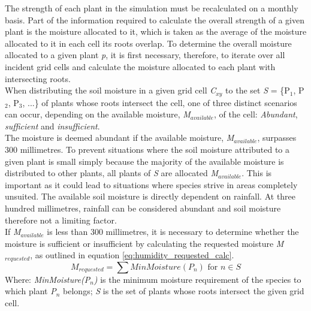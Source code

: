 The strength of each plant in the simulation must be recalculated on a monthly basis. Part of the information required to calculate the overall strength of a given plant is the moisture allocated to it, which is taken as the average of the moisture allocated to it in each cell its roots overlap. To determine the overall moisture allocated to a given plant \textit{p}, it is first necessary, therefore, to iterate over all incident grid cells and calculate the moisture allocated to each plant with intersecting roots.\\

When distributing the soil moisture in a given grid cell \textit{C$_{xy}$} to the set \textit{S} = \{P$_{1}$, P$_{2}$, P$_{3}$, ...\} of plants whose roots intersect the cell, one of three distinct scenarios can occur, depending on the available moisture, \textit{M$_{available}$}, of the cell: \textit{Abundant}, \textit{sufficient} and \textit{insufficient}.\\

The moisture is deemed abundant if the available moisture, \textit{M$_{available}$}, surpasses 300 millimetres. To prevent situations where the soil moisture attributed to a given plant is small simply because the majority of the available moisture is distributed to other plants, all plants of \textit{S} are allocated \textit{M$_{available}$}. This is important as it could lead to situations where species strive in areas completely unsuited. The available soil moisture is directly dependent on rainfall. At three hundred millimetres, rainfall can be considered abundant and soil moisture therefore not a limiting factor. \\

If \textit{M$_{available}$} is less than 300 millimetres, it is necessary to determine whether the moisture is sufficient or insufficient by calculating the requested moisture \textit{M$_{requested}$}, as outlined in equation \ref{eq:humidity_requested_calc}. \\

\begin{equation}
M_{requested} = \sum MinMoisture(P_{n}) \text{ for } n \in S
\label{eq:humidity_requested_calc}
\end{equation}
Where: \textit{MinMoisture(P$_{n}$)} is the minimum moisture requirement of the species to which plant \textit{P$_{n}$} belongs; \textit{S} is the set of plants whose roots intersect the given grid cell.\\

